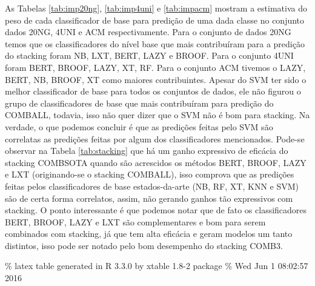 \documentclass[]{article}
\begin{document}
As Tabelas \ref{tab:imp20ng}, \ref{tab:imp4uni} e \ref{tab:impacm}
mostram a estimativa do peso de cada classificador de base para predição
de uma dada classe no conjunto dados 20NG, 4UNI e ACM respectivamente.
Para o conjunto de dados 20NG temos que os classificadores do nível base
que mais contribuíram para a predição do stacking foram NB, LXT, BERT,
LAZY e BROOF. Para o conjunto 4UNI foram BERT, BROOF, LAZY, XT, RF. Para
o conjunto ACM tivemos o LAZY, BERT, NB, BROOF, XT como maiores
contribuintes. Apesar do SVM ter sido o melhor classificador de base
para todos os conjuntos de dados, ele não figurou o grupo de
classificadores de base que mais contribuíram para predição do COMBALL,
todavia, isso não quer dizer que o SVM não é bom para stacking. Na
verdade, o que podemos concluir é que as predições feitas pelo SVM são
correlatas as predições feitas por algum dos classificadores
mencionados. Pode-se observar na Tabela \ref{tab:stacking} que há um
ganho expressivo de eficácia do stacking COMBSOTA quando são acrescidos
os métodos BERT, BROOF, LAZY e LXT (originando-se o stacking COMBALL),
isso comprova que as predições feitas pelos classificadores de base
estados-da-arte (NB, RF, XT, KNN e SVM) são de certa forma correlatos,
assim, não gerando ganhos tão expressivos com stacking. O ponto
interessante é que podemos notar que de fato os classificadores BERT,
BROOF, LAZY e LXT são complementares e bom para serem combinados com
stacking, já que tem alta eficácia e geram modelos um tanto distintos,
isso pode ser notado pelo bom desempenho do stacking COMB3.

\% latex table generated in R 3.3.0 by xtable 1.8-2 package \% Wed Jun 1
08:02:57 2016
\end{document}

